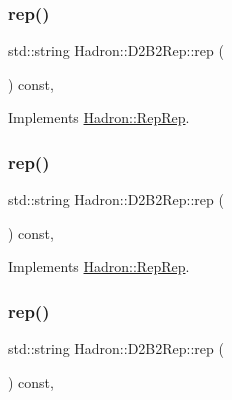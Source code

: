 \subsubsection{\texorpdfstring{rep()}{rep()}\hspace{0.1cm}{\footnotesize\ttfamily [3/5]}}
{\footnotesize\ttfamily std\+::string Hadron\+::\+D2\+B2\+Rep\+::rep (\begin{DoxyParamCaption}{ }\end{DoxyParamCaption}) const\hspace{0.3cm}{\ttfamily [inline]}, {\ttfamily [virtual]}}



Implements \mbox{\hyperlink{structHadron_1_1RepRep_ab3213025f6de249f7095892109575fde}{Hadron\+::\+Rep\+Rep}}.

\mbox{\label{structHadron_1_1D2B2Rep_abef26c913db470d0e9a5c6209c79269f}} 
\subsubsection{\texorpdfstring{rep()}{rep()}\hspace{0.1cm}{\footnotesize\ttfamily [4/5]}}
{\footnotesize\ttfamily std\+::string Hadron\+::\+D2\+B2\+Rep\+::rep (\begin{DoxyParamCaption}{ }\end{DoxyParamCaption}) const\hspace{0.3cm}{\ttfamily [inline]}, {\ttfamily [virtual]}}



Implements \mbox{\hyperlink{structHadron_1_1RepRep_ab3213025f6de249f7095892109575fde}{Hadron\+::\+Rep\+Rep}}.

\mbox{\label{structHadron_1_1D2B2Rep_abef26c913db470d0e9a5c6209c79269f}} 
\subsubsection{\texorpdfstring{rep()}{rep()}\hspace{0.1cm}{\footnotesize\ttfamily [5/5]}}
{\footnotesize\ttfamily std\+::string Hadron\+::\+D2\+B2\+Rep\+::rep (\begin{DoxyParamCaption}{ }\end{DoxyParamCaption}) const\hspace{0.3cm}{\ttfamily [inline]}, {\ttfamily [virtual]}}



